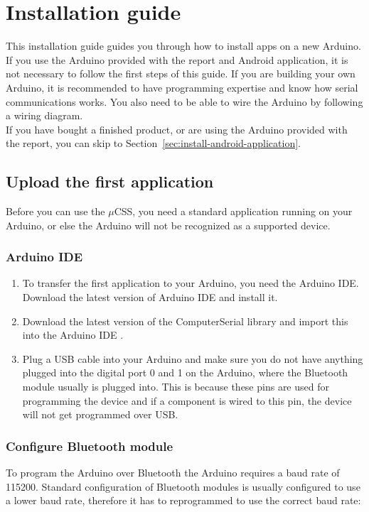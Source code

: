 \chapter{Installation guide}\label{installation-guide}

This installation guide guides you through how to install apps on a new Arduino. If you use the Arduino provided with the report and Android application, it is not necessary to follow the first steps of this guide. If you are building your own Arduino, it is recommended to have programming expertise and know how serial communications works. You also need to be able to wire the Arduino by following a wiring diagram. \\

If you have bought a finished product, or are using the Arduino provided with the report, you can skip to Section~\ref{sec:install-android-application}.

	\section{Upload the first application}
	Before you can use the $\mu$CSS, you need a standard application running on your Arduino, or else the Arduino will not be recognized as a supported device.
	
		\subsection{Arduino IDE}
		\begin{enumerate}
		\item To transfer the first application to your Arduino, you need the Arduino IDE. Download the latest version of Arduino IDE \cite{download-arduino} and install it.
	
		\item Download the latest version of the ComputerSerial library \cite{download-computerserial} and import this into the Arduino IDE \cite{import-libraries}.
	
		\item Plug a USB cable into your Arduino and make sure you do not have anything plugged into the digital port 0 and 1 on the Arduino, where the Bluetooth module usually is plugged into. This is because these pins are used for programming the device and if a component is wired to this pin, the device will not get programmed over USB.
		\end{enumerate}
		
				
		\subsection{Configure Bluetooth module}
		To program the Arduino over Bluetooth the Arduino requires a baud rate of 115200. Standard configuration of Bluetooth modules is usually configured to use a lower baud rate, therefore it has to reprogrammed to use the correct baud rate:\\
		
